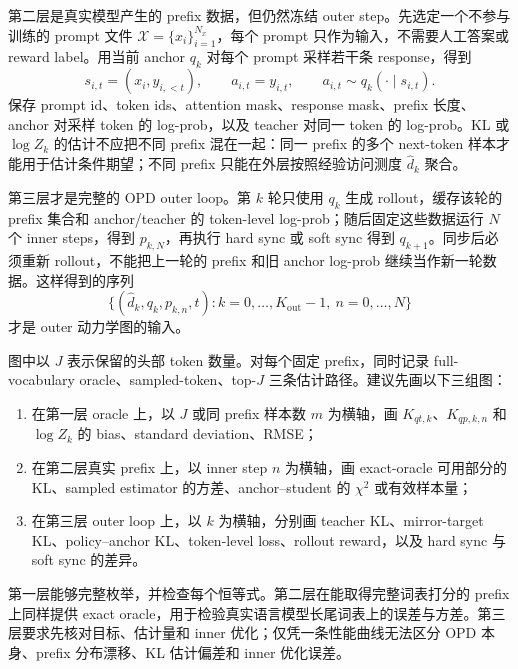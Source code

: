 第二层是真实模型产生的 prefix 数据，但仍然冻结 outer step。先选定一个不参与训练的 prompt 文件 $\mathcal X=\{x_i\}_{i=1}^{N_x}$，每个 prompt 只作为输入，不需要人工答案或 reward label。用当前 anchor $q_k$ 对每个 prompt 采样若干条 response，得到
\begin{equation}
s_{i,t}=(x_i,y_{i,<t}),\qquad a_{i,t}=y_{i,t},\qquad a_{i,t}\sim q_k(\cdot\mid s_{i,t}).
\end{equation}
保存 prompt id、token ids、attention mask、response mask、prefix 长度、anchor 对采样 token 的 log-prob，以及 teacher 对同一 token 的 log-prob。KL 或 $\log Z_k$ 的估计不应把不同 prefix 混在一起：同一 prefix 的多个 next-token 样本才能用于估计条件期望；不同 prefix 只能在外层按照经验访问测度 $\widehat d_k$ 聚合。

第三层才是完整的 OPD outer loop。第 $k$ 轮只使用 $q_k$ 生成 rollout，缓存该轮的 prefix 集合和 anchor/teacher 的 token-level log-prob；随后固定这些数据运行 $N$ 个 inner steps，得到 $p_{k,N}$，再执行 hard sync 或 soft sync 得到 $q_{k+1}$。同步后必须重新 rollout，不能把上一轮的 prefix 和旧 anchor log-prob 继续当作新一轮数据。这样得到的序列
\begin{equation}
\{(\widehat d_k,q_k,p_{k,n},t): k=0,\ldots,K_{\mathrm{out}}-1,\ n=0,\ldots,N\}
\end{equation}
才是 outer 动力学图的输入。

图中以 $J$ 表示保留的头部 token 数量。对每个固定 prefix，同时记录 full-vocabulary oracle、sampled-token、top-$J$ 三条估计路径。建议先画以下三组图：

\begin{enumerate}
\item 在第一层 oracle 上，以 $J$ 或同 prefix 样本数 $m$ 为横轴，画 $K_{qt,k}$、$K_{qp,k,n}$ 和 $\log Z_k$ 的 bias、standard deviation、RMSE；
\item 在第二层真实 prefix 上，以 inner step $n$ 为横轴，画 exact-oracle 可用部分的 KL、sampled estimator 的方差、anchor--student 的 $\chi^2$ 或有效样本量；
\item 在第三层 outer loop 上，以 $k$ 为横轴，分别画 teacher KL、mirror-target KL、policy--anchor KL、token-level loss、rollout reward，以及 hard sync 与 soft sync 的差异。
\end{enumerate}

第一层能够完整枚举，并检查每个恒等式。第二层在能取得完整词表打分的 prefix 上同样提供 exact oracle，用于检验真实语言模型长尾词表上的误差与方差。第三层要求先核对目标、估计量和 inner 优化；仅凭一条性能曲线无法区分 OPD 本身、prefix 分布漂移、KL 估计偏差和 inner 优化误差。

